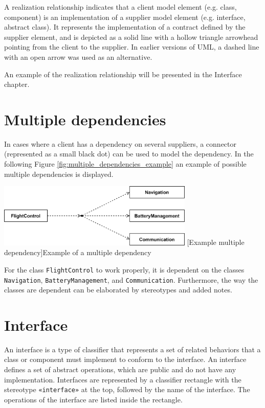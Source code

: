 \documentclass[
	12pt,
    a4paper,
    egregdoesnotlikesansseriftitles, %
    toc=chapterentrywithdots,
    oneside, openany,
    titlepage,
    parskip=half,
    headings=normal,  %
    listof=totoc,
    bibliography=totocnumbered,
    index=totoc,
    captions=tableheading,  %
    listof=flat,
    numbers=noenddot, %
    final]
    {scrbook}
\begin{document}
A realization relationship indicates that a client model element (e.g. class, component) is an implementation of a supplier model element (e.g. interface, abstract class). 
It represents the implementation of a contract defined by the supplier element, and is depicted as a solid line with a hollow triangle arrowhead pointing from the client to the supplier.
In earlier versions of UML, a dashed line with an open arrow was used as an alternative. 
\cite[p.164]{uml}

An example of the realization relationship will be presented in the Interface chapter.


\section{Multiple dependencies}
In cases where a client has a dependency on several suppliers, a connector (represented as a small black dot) can be used to model the dependency.  \cite[p. 160]{uml}
In the following Figure \ref{fig:multiple_dependencies_example} an example of possible multiple dependencies is displayed.

\vspace{1em}
\begin{minipage}{\linewidth}
	\centering
	\includegraphics[width=0.7\textwidth]{figures/dependencies/multiple_dependencies.jpg}
	[Example multiple dependency]{Example of a multiple dependency}
	\label{fig:multiple_dependencies_example}
\end{minipage}

For the class \texttt{FlightControl} to work properly, it is dependent on the classes \texttt{Navigation}, \texttt{BatteryManagement}, and \texttt{Communication}.
Furthermore, the way the classes are dependent can be elaborated by stereotypes and added notes.

\section{Interface}

An interface is a type of classifier that represents a set of related behaviors that a class or component must implement to conform to the interface. 
An interface defines a set of abstract operations, which are public and do not have any implementation.
Interfaces are represented by a classifier rectangle with the stereotype \texttt{«interface»} at the top, followed by the name of the interface. 
The operations of the interface are listed inside the rectangle. \cite[p. 130-131]{uml}
\end{document}
